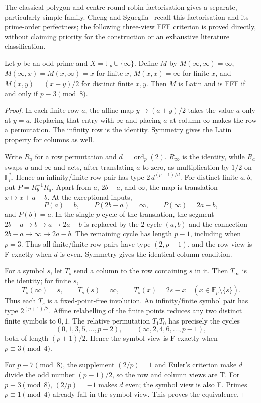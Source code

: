 The classical polygon-and-centre round-robin factorisation gives a separate,
particularly simple family. Cheng and Sgueglia~\cite[Introduction]{ChengSgueglia2026Perfect}
recall this factorisation and its prime-order perfectness; the following
three-view FFF criterion is proved directly, without claiming priority for
the construction or an exhaustive literature classification.

\begin{theorem}
\label{thm:prime-round-robin-fff}
Let $p$ be an odd prime and $X=\mathbb F_p\cup\{\infty\}$. Define $M$ by
$M(\infty,\infty)=\infty$,
$M(\infty,x)=M(x,\infty)=x$ for finite $x$,
$M(x,x)=\infty$ for finite $x$, and
$M(x,y)=(x+y)/2$ for distinct finite $x,y$.
Then $M$ is Latin and is FFF if and only if $p\equiv3\pmod 8$.
\end{theorem}

\begin{proof}
In each finite row $a$, the affine map $y\mapsto(a+y)/2$ takes the value
$a$ only at $y=a$. Replacing that entry with $\infty$ and placing $a$ at
column $\infty$ makes the row a permutation. The infinity row is the
identity. Symmetry gives the Latin property for columns as well.

Write $R_a$ for a row permutation and $d=\operatorname{ord}_p(2)$.
$R_\infty$ is the identity, while $R_a$ swaps $a$ and $\infty$ and acts,
after translating $a$ to zero, as multiplication by $1/2$ on
$\mathbb F_p^*$. Hence an infinity/finite row pair has type
$2\,d^{(p-1)/d}$. For distinct finite $a,b$, put $P=R_b^{-1}R_a$.
Apart from $a$, $2b-a$, and $\infty$, the map is translation
$x\mapsto x+a-b$. At the exceptional inputs,
\[
 P(a)=b,\qquad P(2b-a)=\infty,\qquad P(\infty)=2a-b,
\]
and $P(b)=a$. In the single $p$-cycle of the translation, the segment
$2b-a\to b\to a\to2a-b$ is replaced by the $2$-cycle $(a,b)$ and
the connection $2b-a\to\infty\to2a-b$. The remaining cycle has length
$p-1$, including when $p=3$. Thus all finite/finite row pairs have type
$(2,p-1)$, and the row view is F exactly when $d$ is even. Symmetry gives
the identical column condition.

For a symbol $s$, let $T_s$ send a column to the row containing $s$ in it.
Then $T_\infty$ is the identity; for finite $s$,
\[
 T_s(\infty)=s,\qquad T_s(s)=\infty,\qquad
 T_s(x)=2s-x\quad(x\in\mathbb F_p\setminus\{s\}).
\]
Thus each $T_s$ is a fixed-point-free involution. An infinity/finite
symbol pair has type $2^{(p+1)/2}$. Affine relabelling of the finite
points reduces any two distinct finite symbols to $0,1$.
The relative permutation $T_1T_0$ has precisely the cycles
\[
 (0,1,3,5,\ldots,p-2),\qquad
 (\infty,2,4,6,\ldots,p-1),
\]
both of length $(p+1)/2$. Hence the symbol view is F exactly when
$p\equiv3\pmod4$.

For $p\equiv7\pmod8$, the supplement $(2/p)=1$ and Euler's criterion
make $d$ divide the odd number $(p-1)/2$, so the row and column views
are T. For $p\equiv3\pmod8$, $(2/p)=-1$ makes $d$ even; the symbol view
is also F. Primes $p\equiv1\pmod4$ already fail in the symbol view.
This proves the equivalence.
\end{proof}

